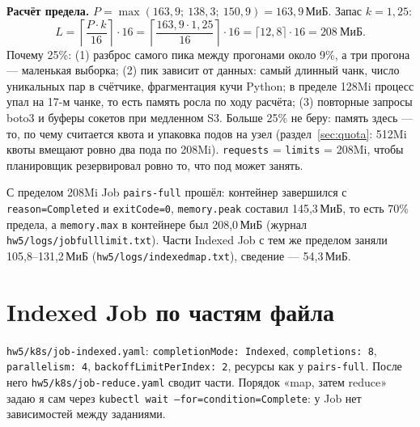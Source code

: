 \documentclass[11pt,a4paper]{article}
\DeclareRobustCommand{\code}[1]{\begingroup\renewcommand{\_}{\textunderscore\allowbreak}\renewcommand{\slash}{/\allowbreak}\texttt{#1}\endgroup}
\newcommand{\logf}[1]{\code{hw5\slash logs\slash #1}}
\begin{document}
\begin{keybox}
\textbf{Расчёт предела.} $P = \max(163{,}9;\ 138{,}3;\ 150{,}9) = 163{,}9$\,МиБ. Запас $k = 1{,}25$:
\[
L = \left\lceil \frac{P \cdot k}{16} \right\rceil \cdot 16 = \left\lceil \frac{163{,}9 \cdot 1{,}25}{16} \right\rceil \cdot 16 = \lceil 12{,}8 \rceil \cdot 16 = 208\ \text{МиБ}.
\]
Почему 25\%: (1) разброс самого пика между прогонами около 9\%, а три прогона --- маленькая выборка; (2) пик зависит от данных: самый длинный чанк, число уникальных пар в счётчике, фрагментация кучи Python; в пределе 128Mi процесс упал на 17-м чанке, то есть память росла по ходу расчёта; (3) повторные запросы boto3 и буферы сокетов при медленном S3. Больше 25\% не беру: память здесь --- то, по чему считается квота и упаковка подов на узел (раздел~\ref{sec:quota}: 512Mi квоты вмещают ровно два пода по 208Mi). \code{requests} = \code{limits} = 208Mi, чтобы планировщик резервировал ровно то, что под может занять.
\end{keybox}

С пределом 208Mi Job \code{pairs-full} прошёл: контейнер завершился с \code{reason=Completed} и \code{exitCode=0}, \code{memory.peak} составил 145,3\,МиБ, то есть 70\% предела, а \code{memory.max} в контейнере был 208,0\,МиБ (журнал \logf{05\_job\_full\_limit.txt}). Части Indexed Job с тем же пределом заняли 105,8--131,2\,МиБ (\logf{06\_indexed\_map.txt}), сведение --- 54,3\,МиБ.

\section{Indexed Job по частям файла}

\code{hw5/k8s/job-indexed.yaml}: \code{completionMode: Indexed}, \code{completions: 8}, \code{parallelism: 4}, \code{backoffLimitPerIndex: 2}, ресурсы как у \code{pairs-full}. После него \code{hw5/k8s/job-reduce.yaml} сводит части. Порядок «map, затем reduce» задаю я сам через \code{kubectl wait --for=condition=Complete}: у Job нет зависимостей между заданиями.
\end{document}
